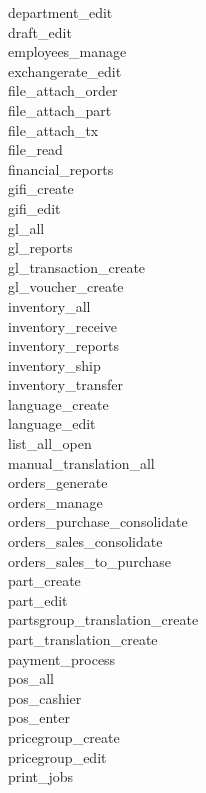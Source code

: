 \begin{description}
\item [department\_edit]
\item [draft\_edit]
\item [employees\_manage]
\item [exchangerate\_edit]
\item [file\_attach\_order]
\item [file\_attach\_part]
\item [file\_attach\_tx]
\item [file\_read]
\item [financial\_reports]
\item [gifi\_create]
\item [gifi\_edit]
\item [gl\_all]
\item [gl\_reports]
\item [gl\_transaction\_create]
\item [gl\_voucher\_create]
\item [inventory\_all]
\item [inventory\_receive]
\item [inventory\_reports]
\item [inventory\_ship]
\item [inventory\_transfer]
\item [language\_create]
\item [language\_edit]
\item [list\_all\_open]
\item [manual\_translation\_all]
\item [orders\_generate]
\item [orders\_manage]
\item [orders\_purchase\_consolidate]
\item [orders\_sales\_consolidate]
\item [orders\_sales\_to\_purchase]
\item [part\_create]
\item [part\_edit]
\item [partsgroup\_translation\_create]
\item [part\_translation\_create]
\item [payment\_process]
\item [pos\_all]
\item [pos\_cashier]
\item [pos\_enter]
\item [pricegroup\_create]
\item [pricegroup\_edit]
\item [print\_jobs]

\end{description}
